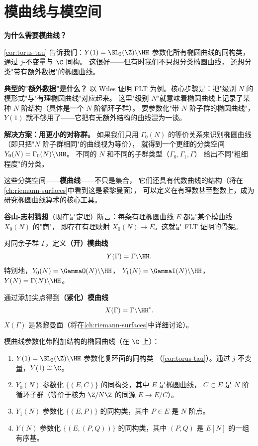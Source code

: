\section{模曲线与模空间}
\label{sec:modular-curves-moduli}

\textbf{为什么需要模曲线？}

\cref{cor:torus-tau} 告诉我们：$Y(1) = \SL_2(\Z) \backslash \HH$
参数化所有椭圆曲线的同构类，通过 $j$-不变量与 $\C$ 同构。
这很好——但有时我们不只想分类椭圆曲线，
还想分类"带有额外数据"的椭圆曲线。

\textbf{典型的"额外数据"是什么？}
以 Wiles 证明 FLT 为例。核心步骤是：把"级别 $N$ 的模形式"与"有理椭圆曲线"对应起来。
这里"级别 $N$"就意味着椭圆曲线上记录了某种 $N$ 阶结构（具体是一个 $N$ 阶循环子群）。
要参数化"带 $N$ 阶子群的椭圆曲线"，$Y(1)$ 就不够用了——它把有无额外结构的曲线混为一谈。

\textbf{解决方案：用更小的对称群。}
如果我们只用 $\Gamma_0(N)$ 的等价关系来识别椭圆曲线
（即只把"$N$ 阶子群相同"的曲线视为等价），
就得到一个更细的分类空间 $Y_0(N) = \Gamma_0(N) \backslash \HH$。
不同的 $N$ 和不同的子群类型（$\Gamma_0, \Gamma_1, \Gamma$）
给出不同"粗细程度"的分类。

这些分类空间——\textbf{模曲线}——不只是集合，
它们还具有代数曲线的结构（将在\cref{ch:riemann-surfaces}中看到这是紧黎曼面），
可以定义在有理数甚至整数上，成为研究椭圆曲线算术的核心工具。

\textbf{谷山-志村猜想}（现在是定理）断言：每条有理椭圆曲线 $E$ 都是某个模曲线 $X_0(N)$ 的"商"，
即存在有理映射 $X_0(N) \to E$。这就是 FLT 证明的骨架。

\begin{definition}[模曲线]
\label{def:modular-curves}
对同余子群 $\Gamma$，定义\textbf{（开）模曲线}
\[
  Y(\Gamma) = \Gamma \backslash \HH.
\]
特别地，$Y_0(N) = \GammaO(N) \backslash \HH$，
$Y_1(N) = \GammaI(N) \backslash \HH$，
$Y(N) = \Gamma(N) \backslash \HH$。

通过添加尖点得到\textbf{（紧化）模曲线}
\[
  X(\Gamma) = \Gamma \backslash \HH^*.
\]
$X(\Gamma)$ 是紧黎曼面（将在\cref{ch:riemann-surfaces}中详细讨论）。
\end{definition}

\begin{theorem}[模诠释]
\label{thm:moduli-interpretation}
模曲线参数化带附加结构的椭圆曲线（在 $\C$ 上）：
\begin{enumerate}
  \item $Y(1) = \SL_2(\Z) \backslash \HH$ 参数化复环面的同构类
    （\cref{cor:torus-tau}）。通过 $j$-不变量，$Y(1) \cong \C$。
  \item $Y_0(N)$ 参数化 $\{(E, C)\}$ 的同构类，其中 $E$ 是椭圆曲线，
    $C \subset E$ 是 $N$ 阶循环子群（等价于核为 $\Z/N\Z$ 的同源
    $E \to E/C$）。
  \item $Y_1(N)$ 参数化 $\{(E, P)\}$ 的同构类，其中 $P \in E$ 是
    $N$ 阶点。
  \item $Y(N)$ 参数化 $\{(E, (P, Q))\}$ 的同构类，其中 $(P, Q)$ 是
    $E[N]$ 的一组有序基。
\end{enumerate}
\end{theorem}

